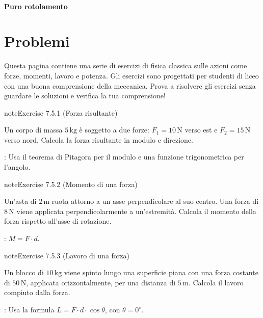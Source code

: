 \documentclass[letterpaper,10pt,italian]{jupyterBook}
\begin{document}
\paragraph{Puro rotolamento}
\label{\detokenize{ch/mechanics/actions-examples:puro-rotolamento}}
\sphinxstepscope


\section{Problemi}
\label{\detokenize{ch/mechanics/actions-problems:problemi}}\label{\detokenize{ch/mechanics/actions-problems::doc}}
\sphinxAtStartPar
Questa pagina contiene una serie di esercizi di fisica classica sulle azioni come forze, momenti, lavoro e potenza. Gli esercizi sono progettati per studenti di liceo con una buona comprensione della meccanica. Prova a risolvere gli esercizi senza guardare le soluzioni e verifica la tua comprensione!
 \label{exercise:ch/mechanics/actions-problems-exercise-0}

\begin{sphinxadmonition}{note}{Exercise 7.5.1 (Forza risultante)}



\sphinxAtStartPar
Un corpo di massa \(5 \, \text{kg}\) è soggetto a due forze: \(F_1 = 10 \, \text{N}\) verso est e \(F_2 = 15 \, \text{N}\) verso nord. Calcola la forza risultante in modulo e direzione.

\sphinxAtStartPar
{}: Usa il teorema di Pitagora per il modulo e una funzione trigonometrica per l’angolo.
\end{sphinxadmonition}
 \label{exercise:ch/mechanics/actions-problems-exercise-1}

\begin{sphinxadmonition}{note}{Exercise 7.5.2 (Momento di una forza)}



\sphinxAtStartPar
Un’asta di \(2 \, \text{m}\) ruota attorno a un asse perpendicolare al suo centro. Una forza di \(8 \, \text{N}\) viene applicata perpendicolarmente a un’estremità. Calcola il momento della forza rispetto all’asse di rotazione.

\sphinxAtStartPar
{}: \( M = F \cdot d \).
\end{sphinxadmonition}
 \label{exercise:ch/mechanics/actions-problems-exercise-2}

\begin{sphinxadmonition}{note}{Exercise 7.5.3 (Lavoro di una forza)}



\sphinxAtStartPar
Un blocco di \(10 \, \text{kg}\) viene spinto lungo una superficie piana con una forza costante di \(50 \, \text{N}\), applicata orizzontalmente, per una distanza di \(5 \, \text{m}\). Calcola il lavoro compiuto dalla forza.

\sphinxAtStartPar
{}: Usa la formula \( L = F \cdot d \cdot \cos\theta \), con \(\theta = 0^\circ\).
\end{sphinxadmonition}
 \label{exercise:ch/mechanics/actions-problems-exercise-3}
\end{document}
